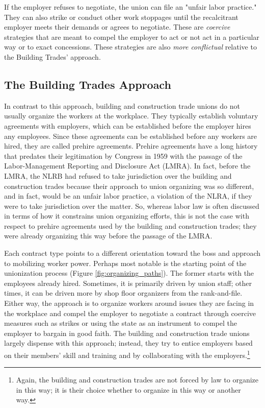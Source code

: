 \documentclass[12pt]{article}
\begin{document}
If the employer refuses to negotiate, the union can file an "unfair labor practice." They can also strike or conduct other work stoppages until the recalcitrant employer meets their demands or agrees to negotiate. These are \textit{coercive} strategies that are meant to compel the employer to act or not act in a particular way or to exact concessions. These strategies are also \textit{more conflictual} relative to the Building Trades' approach.

\subsection{The Building Trades Approach}

In contrast to this approach, building and construction trade unions do not usually organize the workers at the workplace. They typically establish voluntary agreements with employers, which can be established before the employer hires any employees. Since these agreements can be established before any workers are hired, they are called prehire agreements. Prehire agreements have a long history that predates their legitimation by Congress in 1959 with the passage of the Labor-Management Reporting and Disclosure Act (LMRA). In fact, before the LMRA, the NLRB had refused to take jurisdiction over the building and construction trades because their approach to union organizing was so different, and in fact, would be an unfair labor practice, a violation of the NLRA, if they were to take jurisdiction over the matter. So, whereas labor law is often discussed in terms of how it constrains union organizing efforts, this is not the case with respect to prehire agreements used by the building and construction trades; they were already organizing this way before the passage of the LMRA.

Each contract type points to a different orientation toward the boss and approach to mobilizing worker power. Perhaps most notable is the starting point of the unionization process (Figure \ref{fig:organizing_paths}). The former starts with the employees already hired. Sometimes, it is primarily driven by union staff; other times, it can be driven more by shop floor organizers from the rank-and-file. Either way, the approach is to organize workers around issues they are facing in the workplace and compel the employer to negotiate a contract through coercive measures such as strikes or using the state as an instrument to compel the employer to bargain in good faith. The building and construction trade unions largely dispense with this approach; instead, they try to entice employers based on their members’ skill and training and by collaborating with the employers.\footnote{Again, the building and construction trades are not forced by law to organize in this way; it is their choice whether to organize in this way or another way.}
\end{document}

